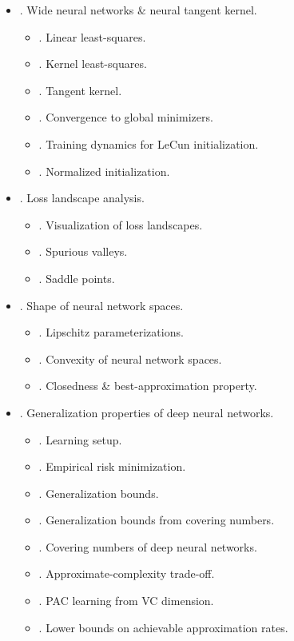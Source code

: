 \documentclass{article}
\begin{document}
\begin{itemize}
\begin{itemize}
	\end{itemize}
	\item {. Wide neural networks \& neural tangent kernel.}
	\begin{itemize}
		\item {. Linear least-squares.}
		\item {. Kernel least-squares.}
		\item {. Tangent kernel.}
		\item {. Convergence to global minimizers.}
		\item {. Training dynamics for LeCun initialization.}
		\item {. Normalized initialization.}
	\end{itemize}
	\item {. Loss landscape analysis.}
	\begin{itemize}
		\item {. Visualization of loss landscapes.}
		\item {. Spurious valleys.}
		\item {. Saddle points.}
	\end{itemize}
	\item {. Shape of neural network spaces.}
	\begin{itemize}
		\item {. Lipschitz parameterizations.}
		\item {. Convexity of neural network spaces.}
		\item {. Closedness \& best-approximation property.}
	\end{itemize}
	\item {. Generalization properties of deep neural networks.}
	\begin{itemize}
		\item {. Learning setup.}
		\item {. Empirical risk minimization.}
		\item {. Generalization bounds.}
		\item {. Generalization bounds from covering numbers.}
		\item {. Covering numbers of deep neural networks.}
		\item {. Approximate-complexity trade-off.}
		\item {. PAC learning from VC dimension.}
		\item {. Lower bounds on achievable approximation rates.}

\end{itemize}
\end{itemize}
\end{document}
